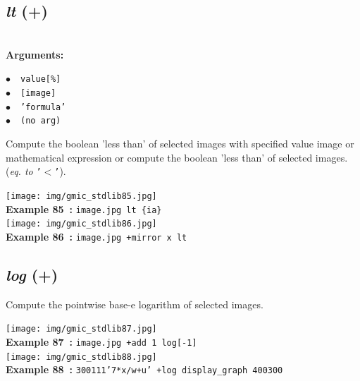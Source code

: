 \documentclass[a4paper,10.5pt,twoside]{book}
\def\comma{\discretionary{,}{}{,}}
\newcommand{\Cb}[1]{\textcolor{cb}{#1}}
\begin{document}
\subsection{\emph{lt} (+)}\vspace*{-0.7em}
~\\\textbf{\Cb{Arguments: }}\begin{flushleft}
{\small \Cb{\hspace*{0.5cm}$\bullet$~~\texttt{value[\%]}}}~~~\\
{\small \Cb{\hspace*{0.5cm}$\bullet$~~\texttt{[image]}}}~~~\\
{\small \Cb{\hspace*{0.5cm}$\bullet$~~\texttt{'formula'}}}~~~\\
{\small \Cb{\hspace*{0.5cm}$\bullet$~~\texttt{(no arg)}}}\end{flushleft}
Compute the boolean 'less than' of selected images with specified value{\comma} image or
mathematical expression{\comma} or compute the boolean 'less than' of selected images.
~\\(\emph{eq. to} {\small \texttt{'$<$'}}).
\begin{center}\texttt{[image: img/gmic\_stdlib85.jpg]}\\
{\footnotesize \textbf{Example 85~:} \texttt{image.jpg lt \{ia\}}}
\\\texttt{[image: img/gmic\_stdlib86.jpg]}\\
{\footnotesize \textbf{Example 86~:} \texttt{image.jpg +mirror x lt}}
\end{center}

\subsection{\emph{log} (+)}\vspace*{-0.7em}
Compute the pointwise base-e logarithm of selected images.
\begin{center}\texttt{[image: img/gmic\_stdlib87.jpg]}\\
{\footnotesize \textbf{Example 87~:} \texttt{image.jpg +add 1 log[-1]}}
\\\texttt{[image: img/gmic\_stdlib88.jpg]}\\
{\footnotesize \textbf{Example 88~:} \texttt{300{\comma}1{\comma}1{\comma}1{\comma}'7*x/w+u' +log display\_graph 400{\comma}300}}
\end{center}
\end{document}
